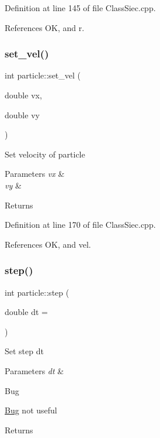Definition at line 145 of file Class\+Siec.\+cpp.



References OK, and r.

\mbox{\label{structparticle_aafcf36063e5b6b0719b7ee8377f3c880}} 
\subsubsection{\texorpdfstring{set\+\_\+vel()}{set\_vel()}}
{\footnotesize\ttfamily int particle\+::set\+\_\+vel (\begin{DoxyParamCaption}\item[{double}]{vx,  }\item[{double}]{vy }\end{DoxyParamCaption})}

Set velocity of particle 
\begin{DoxyParams}{Parameters}
{\em vx} & \\
\hline
{\em vy} & \\
\hline
\end{DoxyParams}
\begin{DoxyReturn}{Returns}

\end{DoxyReturn}


Definition at line 170 of file Class\+Siec.\+cpp.



References OK, and vel.

\mbox{\label{structparticle_a4f06bd4316643ca9ba721a4f768763a6}} 
\subsubsection{\texorpdfstring{step()}{step()}}
{\footnotesize\ttfamily int particle\+::step (\begin{DoxyParamCaption}\item[{double}]{dt = {} }\end{DoxyParamCaption})}

Set step dt 
\begin{DoxyParams}{Parameters}
{\em dt} & \\
\hline
\end{DoxyParams}
\begin{DoxyRefDesc}{Bug}
\item[\mbox{\hyperlink{bug__bug000002}{Bug}}]not useful \end{DoxyRefDesc}
\begin{DoxyReturn}{Returns}

\end{DoxyReturn}


